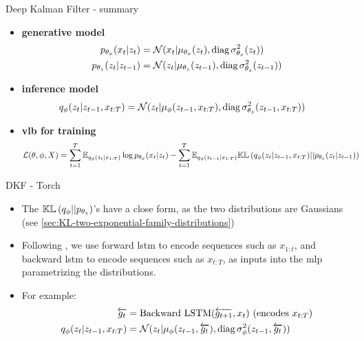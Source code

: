 \begin{frame}{Deep Kalman Filter - summary}
\begin{tcolorbox}[colback=blue!5!white,colframe=black!75!black,title=Deep Kalman Filter]
\begin{itemize}
    \item \textbf{generative model}
    \begin{align}
        \label{gen_model_dkf}
        p_{\theta_x}(x_t \vert z_t) &= \mathcal{N}( x_t \vert \mu_{\theta_x}(z_t), \text{diag}\, \sigma_{\theta_x}^2(z_t))\\
        p_{\theta_z}(z_t \vert z_{t-1}) &= \mathcal{N}( z_t \vert \mu_{\theta_z}(z_{t-1}), \text{diag}\, \sigma_{\theta_z}^2(z_{t-1}))
    \end{align}
    \item \textbf{inference model}
    \begin{align}
        \label{inf_model_dkf}
        q_{\phi}(z_t \vert z_{t-1}, x_{t:T}) &= \mathcal{N}( z_t \vert \mu_{\phi}(z_{t-1}, x_{t:T}), \text{diag}\, \sigma_{\theta_z}^2(z_{t-1},x_{t:T}))
    \end{align}
    \item \textbf{\gls{vlb} for training}
    \begin{align}
        \label{vlb_dkf}
        \mathcal{L}(\theta, \phi, X) &= \sum_{t=1}^T \mathbb{E}_{q_\phi(z_{t} \vert x_{1:T})} \log{p_{\theta_x}(x_t \vert z_t)} - \sum_{t=1}^T \mathbb{E}_{q_\phi(z_{t-1} \vert x_{1:T})} \mathbb{KL}\left( q_{\phi}(z_t \vert z_{t-1}, x_{t:T}) \vert\vert p_{\theta_z}(z_t \vert z_{t-1}) \right)
    \end{align}
\end{itemize}
\end{tcolorbox}
\end{frame}

\begin{frame}{DKF - Torch}
    \begin{itemize}
        \item The $\mathbb{KL}\left( q_\phi \vert\vert p_{\theta_z} \right)$'s have a close form, as the two distributions are Gaussians (see \ref{sec:KL-two-exponential-family-distributions})

        \item Following \cite{girin_dynamical_2022}, we use forward \gls{lstm} to encode sequences such as $x_{1:t}$, and backward \gls{lstm} to encode sequences such as $x_{t:T}$, as inputs into the \gls{mlp} parametrizing the distributions. 
        \item For example:
            \begin{align*}
                \overleftarrow{g_t} &= \text{Backward LSTM}(\overleftarrow{g_{t+1}}, x_t) \,\, (\text{encodes} \,\, x_{t:T}) \\
                q_{\phi}(z_t \vert z_{t-1}, x_{t:T}) &= \mathcal{N}( z_t \vert \mu_{\phi}(z_{t-1}, \overleftarrow{g_t}), \text{diag}\, \sigma_{\phi}^2(z_{t-1}, \overleftarrow{g_t}))
            \end{align*}
    \end{itemize}
\end{frame}


